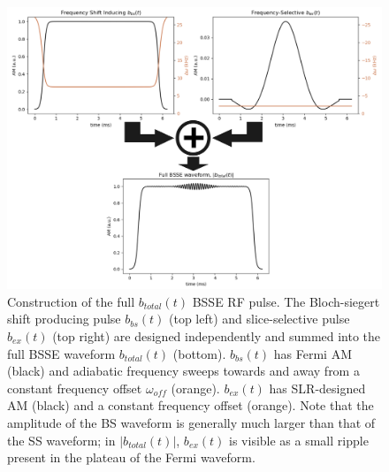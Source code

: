 \documentclass{article}
\begin{document}
\begin{figure}[h]
\centering
\includegraphics[width=1.1\textwidth]{figures/pulse_construction.png}
\caption{Construction of the full $b_{total}(t)$ BSSE RF pulse. The Bloch-siegert shift producing pulse $b_{bs}(t)$ (top left) and slice-selective pulse $b_{ex}(t)$ (top right) are designed independently and summed into the full BSSE waveform $b_{total}(t)$ (bottom). $b_{bs}(t)$ has Fermi AM (black) and adiabatic frequency sweeps towards and away from a constant frequency offset $\omega_{off}$ (orange). $b_{ex}(t)$ has SLR-designed AM (black) and a constant frequency offset (orange). 
Note that the amplitude of the BS waveform is generally much larger than that of the SS waveform; in $|b_{total}(t)|$, $b_{ex}(t)$ is visible as a small ripple present in the plateau of the Fermi waveform.}
\label{fig:alg}
\end{figure}
\end{document}

